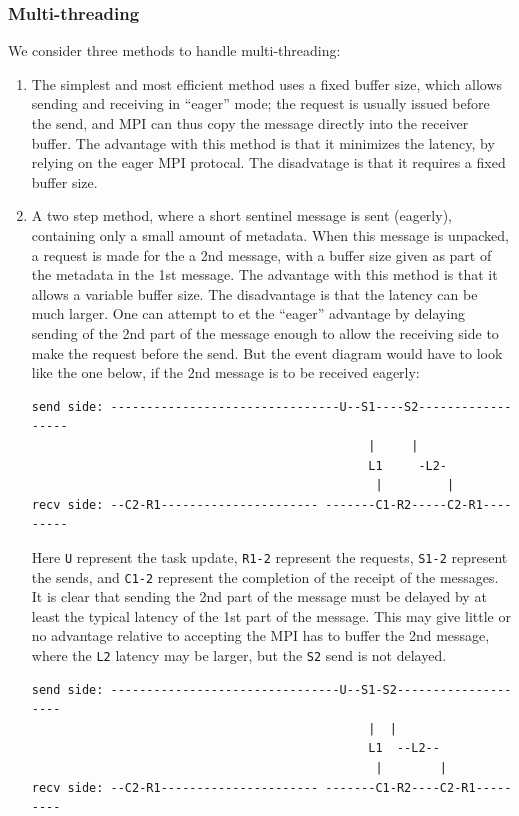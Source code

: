 \documentclass[paper=a4,fontsize=11pt]{scrartcl}
\numberwithin{equation}{section}		%
\numberwithin{figure}{section}			%
\numberwithin{table}{section}				%
\newcommand{\codecolor}{\color{Blue}}
\newcommand{\Code}[1]{{\codecolor\texttt{#1}}}
\begin{document}
\subsubsection{Multi-threading}
We consider three methods to handle multi-threading:
\begin{enumerate}
    \item The simplest and most efficient method uses a fixed buffer size, which allows sending and receiving in ``eager'' mode; the request is usually issued before the send, and MPI can thus copy the message directly into the receiver buffer.  The advantage with this method is that it minimizes the latency, by relying on the eager MPI protocal.  The disadvatage is that it requires a fixed buffer size.
    \item A two step method, where a short sentinel message is sent (eagerly), containing only a small amount of metadata.  When this message is unpacked, a request is made for the a 2nd message, with a buffer size given as part of the metadata in the 1st message.  The advantage with this method is that it allows a variable buffer size.  The disadvantage is that the latency can be much larger. 
    One can attempt to et the ``eager'' advantage by delaying sending of the 2nd part of the message enough to allow the receiving side to make the request before the send. But the event diagram would have to look like the one below, if the 2nd message is to be received eagerly:
{\codecolor\begin{verbatim}
send side: --------------------------------U--S1----S2------------------
                                               |     |
                                               L1     -L2-
                                                |         |
recv side: --C2-R1---------------------- -------C1-R2-----C2-R1---------
\end{verbatim}}
    Here \Code{U} represent the task update, \Code{R1-2} represent the requests, \Code{S1-2} represent the sends, and \Code{C1-2} represent the completion of the receipt of the messages.  It is clear that sending the 2nd part of the message must be delayed by at least the typical latency of the 1st part of the message.  This may give little or no advantage relative to accepting the MPI has to buffer the 2nd message, where the \Code{L2} latency may be larger, but the \Code{S2} send is not delayed.
{\codecolor\begin{verbatim}
send side: --------------------------------U--S1-S2--------------------
                                               |  |
                                               L1  --L2--
                                                |        |
recv side: --C2-R1---------------------- -------C1-R2----C2-R1---------
\end{verbatim}}


\end{enumerate}
\end{document}

